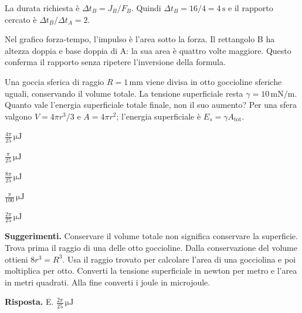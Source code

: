 \documentclass[11pt,a4paper]{article}
\begin{document}
\begin{samepage}
La durata richiesta è \(\Delta t_B=J_B/F_B\). Quindi \(\Delta t_B=16/4=4\,\mathrm{s}\) e il rapporto cercato è \(\Delta t_B/\Delta t_A=2\).\par

Nel grafico forza-tempo, l’impulso è l’area sotto la forza. Il rettangolo B ha altezza doppia e base doppia di A: la sua area è quattro volte maggiore. Questo conferma il rapporto senza ripetere l’inversione della formula.\par

\end{samepage}
\newpage
\begin{samepage}
\par\smallskip
Una goccia sferica di raggio \(R=1\,\mathrm{mm}\) viene divisa in otto goccioline sferiche uguali, conservando il volume totale. La tensione superficiale resta \(\gamma=10\,\mathrm{mN/m}\). Quanto vale l’energia superficiale totale finale, non il suo aumento? Per una sfera valgono \(V=4\pi r^3/3\) e \(A=4\pi r^2\); l’energia superficiale è \(E_s=\gamma A_{\mathrm{tot}}\).\par


\begin{list}{}{\setlength{\leftmargin}{1.4em}\setlength{\itemsep}{.1em}\setlength{\parsep}{0pt}}\small
\item[A.] \(\frac{4\pi}{25}\,\mathrm{\mu J}\)
\item[B.] \(\frac{\pi}{25}\,\mathrm{\mu J}\)
\item[C.] \(\frac{8\pi}{25}\,\mathrm{\mu J}\)
\item[D.] \(\frac{\pi}{100}\,\mathrm{\mu J}\)
\item[E.] \(\frac{2\pi}{25}\,\mathrm{\mu J}\)
\end{list}
{\small\textbf{Suggerimenti.} Conservare il volume totale non significa conservare la superficie. Trova prima il raggio di una delle otto goccioline. Dalla conservazione del volume ottieni \(8r^3=R^3\). Usa il raggio trovato per calcolare l’area di una gocciolina e poi moltiplica per otto. Converti la tensione superficiale in newton per metro e l’area in metri quadrati. Alla fine converti i joule in microjoule.\par}
\medskip\noindent\textbf{Risposta.} E. \(\frac{2\pi}{25}\,\mathrm{\mu J}\)\par



\end{samepage}
\end{document}
